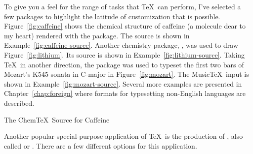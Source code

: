 To give you a feel for the range of tasks that \TeX\ can perform, I've
selected a few packages to highlight the latitude of customization that is
possible.  Figure~\ref{fig:caffeine} shows the chemical structure of caffeine
(a molecule dear to my heart) rendered with 
the  package.
The source is shown in Example~\ref{fig:caffeine-source}. Another chemistry
package, , was 
used to draw Figure~\ref{fig:lithium}.
Its source is shown in Example~\ref{fig:lithium-source}.  Taking \TeX\ in
another direction, the  package 
was used to typeset the first two
bars of Mozart's K545 sonata in C-major in Figure~\ref{fig:mozart}.  The
Music\TeX\ input is shown in Example~\ref{fig:mozart-source}.  
Several more examples are presented in Chapter~\ref{chap:foreign} where
formats for typesetting non-English languages are described.




%
  {The Chem\protect\TeX\ Source for Caffeine}






\newpage
{}

Another popular special-purpose application of \TeX\ is the production
of , also 
called  or .  There are a few
different options for this application.

\subsection{\protect\SliTeX}

